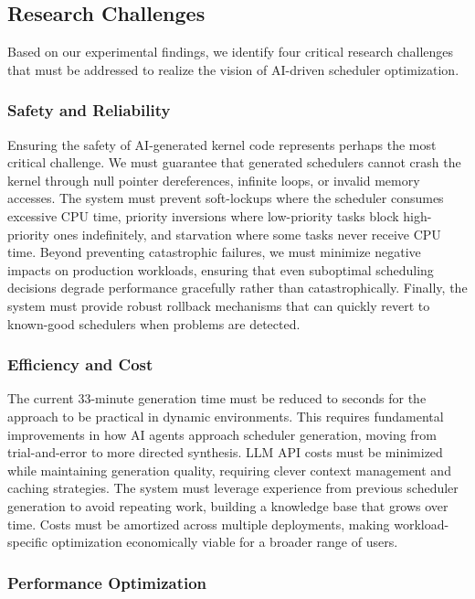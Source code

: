 \subsection{Research Challenges}

Based on our experimental findings, we identify four critical research challenges that must be addressed to realize the vision of AI-driven scheduler optimization.

\subsubsection{Safety and Reliability}

Ensuring the safety of AI-generated kernel code represents perhaps the most critical challenge. We must guarantee that generated schedulers cannot crash the kernel through null pointer dereferences, infinite loops, or invalid memory accesses. The system must prevent soft-lockups where the scheduler consumes excessive CPU time, priority inversions where low-priority tasks block high-priority ones indefinitely, and starvation where some tasks never receive CPU time. Beyond preventing catastrophic failures, we must minimize negative impacts on production workloads, ensuring that even suboptimal scheduling decisions degrade performance gracefully rather than catastrophically. Finally, the system must provide robust rollback mechanisms that can quickly revert to known-good schedulers when problems are detected.

\subsubsection{Efficiency and Cost}

The current 33-minute generation time must be reduced to seconds for the approach to be practical in dynamic environments. This requires fundamental improvements in how AI agents approach scheduler generation, moving from trial-and-error to more directed synthesis. LLM API costs must be minimized while maintaining generation quality, requiring clever context management and caching strategies. The system must leverage experience from previous scheduler generation to avoid repeating work, building a knowledge base that grows over time. Costs must be amortized across multiple deployments, making workload-specific optimization economically viable for a broader range of users.

\subsubsection{Performance Optimization}

